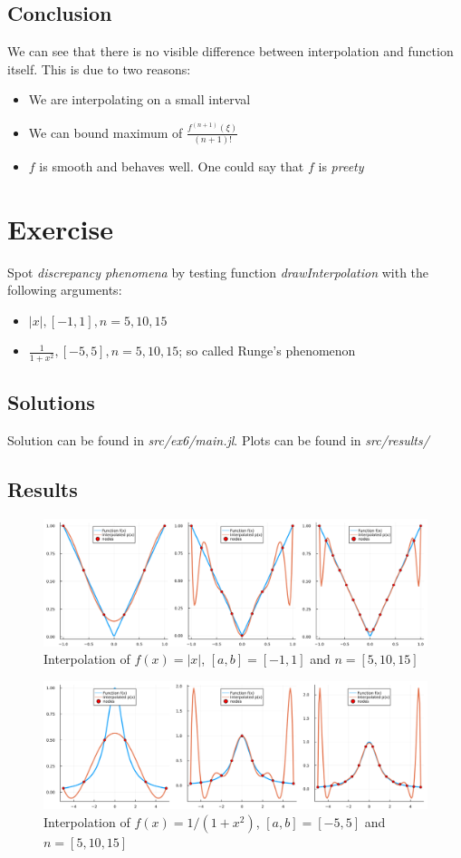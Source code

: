 \documentclass[11pt]{article}
\begin{document}
\subsection*{Conclusion}
We can see that there is no visible difference between interpolation and function itself. 
This is due to two reasons:
\begin{itemize}
    \item We are interpolating on a small interval
    \item We can bound maximum of $\frac{f^{(n+1)}(\xi)}{(n+1)!}$
    \item $f$ is smooth and behaves well. One could say that $f$ is \textit{preety}
\end{itemize}
\section{Exercise}
Spot \textit{discrepancy phenomena} by testing function \textit{drawInterpolation} with the following arguments:
\begin{itemize}
    \item $|x|, [-1, 1], n=5,10,15$
    \item $\frac{1}{1+x^2}, [-5, 5], n=5,10,15$; so called Runge's phenomenon
\end{itemize}
\subsection*{Solutions}
Solution can be found in \textit{src/ex6/main.jl}. Plots can be found in \textit{src/results/}
\subsection*{Results}
\begin{figure}[h]
    \centering
    \includegraphics[width=1\textwidth]{ex6_plot1.png}
    \caption{Interpolation of $f(x)=|x|$, $[a,b] = [-1,1]$ and $n = [5,10,15]$}
\end{figure}
\begin{figure}[h]
    \centering
    \includegraphics[width=1\textwidth]{ex6_plot2.png}
    \caption{Interpolation of $f(x)=1/(1+x^2)$, $[a,b] = [-5,5]$ and $n = [5,10,15]$}
\end{figure}
\end{document}
